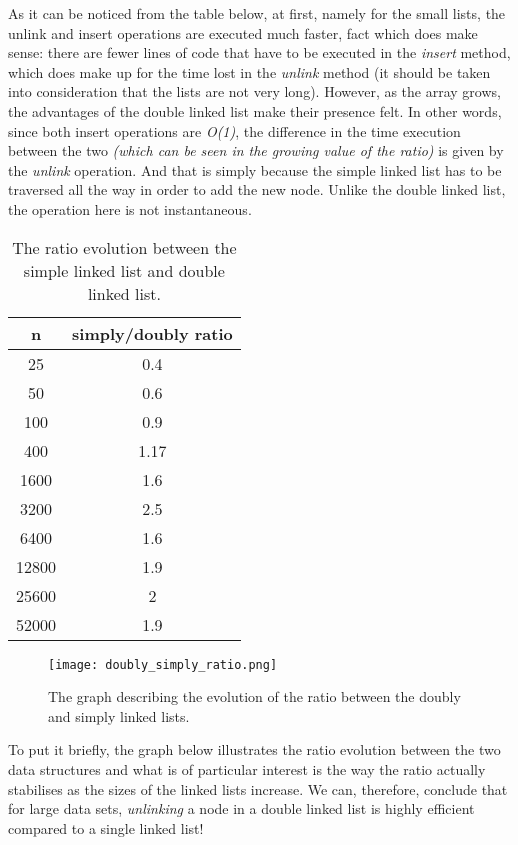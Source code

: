 \documentclass[a4paper,11pt]{article}
\begin{document}
As it can be noticed from the table below, at first, namely for the small lists, the unlink and insert operations are executed much faster, fact which does make sense: there are fewer lines of code that have to be executed in the \textit{insert} method, which does make up for the time lost in the \textit{unlink} method (it should be taken into consideration that the lists are not very long). \newline\newline
However, as the 
array grows, the advantages of the double linked list make their presence felt. In other words, since both insert operations are \textit{O(1)}, 
the difference in the time execution between the two \textit{(which can be seen in the growing value of the ratio) }is given by the \textit{unlink} operation.\newline \newline
And that is simply because the simple linked list has to be traversed all the way in order to add the new node. Unlike the double linked list, the operation here is not instantaneous.


\begin{table}[h!]
    \centering
    \begin{tabular}{||c c||} 
    \hline
     n & simply/doubly ratio \\ [0.5ex]
    \hline
    25 & 0.4 \\
    50 & 0.6 \\
    100 & 0.9 \\
    400 & 1.17 \\
    1600 & 1.6 \\
    3200 & 2.5 \\
    6400 & 1.6 \\
    12800 & 1.9 \\
    25600 & 2 \\
    52000 & 1.9 \\[1ex]
    \hline
    \end{tabular}
    \caption{The ratio evolution between the simple linked list and double linked list.} 
    \label{table:2}
\end{table}

\begin{figure}[ht]
    \centering
    \texttt{[image: doubly\_simply\_ratio.png]}
    \caption{The graph describing the evolution of the ratio between the doubly and simply linked lists.}
    \label{fig:1}
\end{figure} 
  

To put it briefly, the graph below illustrates the ratio evolution between the two data structures and what is of particular interest is the way the ratio actually stabilises as the sizes of the linked lists increase. We can, therefore, conclude that for large data sets, \textit{unlinking} a node in a double linked list is highly efficient compared to a single linked list! \newline
\end{document}
